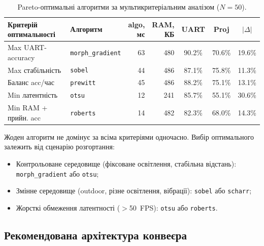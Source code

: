 \documentclass[a4paper,12pt]{article}
\begin{document}
\begin{table}[H]
	\centering\small
	\renewcommand{\arraystretch}{1.15}
	\caption{Pareto-оптимальні алгоритми за мультикритеріальним аналізом ($N=50$).}
	\begin{tabular}{@{}l l r r c c c@{}}
		\toprule
		Критерій оптимальності & Алгоритм & \shortstack{algo,\\мс} & \shortstack{RAM,\\КБ} & UART & Proj & $|\Delta|$ \\
		\midrule
		Max UART-accuracy     & \texttt{morph\_gradient} & 63  & 480 & 90.2\% & 70.6\% & 19.6\% \\
		Max стабільність      & \texttt{sobel}           & 44  & 486 & 87.1\% & 75.8\% & 11.3\% \\
		Баланс acc/час        & \texttt{prewitt}         & 45  & 486 & 88.2\% & 75.1\% & 13.1\% \\
		Min латентність       & \texttt{otsu}            & 12  & 241 & 85.7\% & 55.1\% & 30.6\% \\
		Min RAM + прийн. acc  & \texttt{roberts}         & 14  & 482 & 82.3\% & 68.0\% & 14.3\% \\
		\bottomrule
	\end{tabular}
\end{table}

Жоден алгоритм не домінує за всіма критеріями одночасно. Вибір оптимального залежить від сценарію розгортання:
\begin{itemize}
	\item Контрольоване середовище (фіксоване освітлення, стабільна відстань): \texttt{morph\_gradient} або \texttt{otsu};
	\item Змінне середовище (outdoor, різне освітлення, вібрації): \texttt{sobel} або \texttt{scharr};
	\item Жорсткі обмеження латентності ($>$50~FPS): \texttt{otsu} або \texttt{roberts}.
\end{itemize}

\subsection{Рекомендована архітектура конвеєра}
\end{document}
